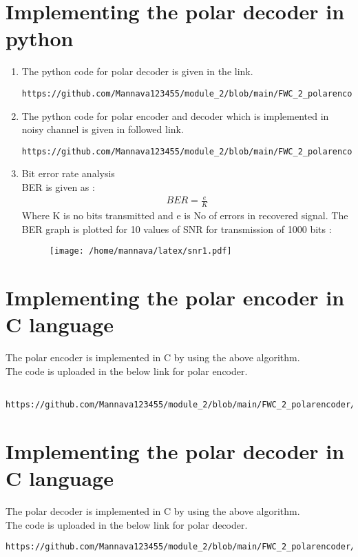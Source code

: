 \documentclass[journal,5pt,twocolumn]{IEEEtran}
\begin{document}
\section{\textbf{Implementing the polar decoder in python}}
\begin{enumerate}
\item The python code for polar decoder is given in the link.\vspace{5mm} 
\begin{lstlisting}
https://github.com/Mannava123455/module_2/blob/main/FWC_2_polarencoder/codes/polar_python/polar_encoder_and_decoder.py
\end{lstlisting}
\item The python code for polar encoder and decoder which is implemented in noisy channel is given in followed link.
\begin{lstlisting}
https://github.com/Mannava123455/module_2/blob/main/FWC_2_polarencoder/codes/polar_python/polarencoder_in_noisychannel.py
\end{lstlisting}
\item Bit error rate analysis \\
BER is given as :\\
\begin{align}
BER = \frac{e}{K}
\end{align}
Where K is no bits transmitted and e is No of errors in recovered signal.
The BER graph is plotted for 10 values of SNR for transmission of 1000 bits :
\begin{figure}[!ht]
\begin{center}
\texttt{[image: /home/mannava/latex/snr1.pdf]}
\end{center}
\label{fig : check}
\end{figure}
\end{enumerate}
\section{\textbf{Implementing the polar encoder in C language}}
The polar encoder is implemented in C by using the above algorithm. \\
 The code is uploaded in the below link for polar encoder.\\
 \begin{lstlisting}
 https://github.com/Mannava123455/module_2/blob/main/FWC_2_polarencoder/codes/polar_in_c_language/main.c
 \end{lstlisting}
\section{\textbf{Implementing the polar decoder in C language}}
The polar decoder is implemented in C by using the above algorithm. \\
 The code is uploaded in the below link for polar decoder.\\
 \begin{lstlisting}
https://github.com/Mannava123455/module_2/blob/main/FWC_2_polarencoder/codes/polar_decoder_c/decoder.c
 \end{lstlisting}
\end{document}
